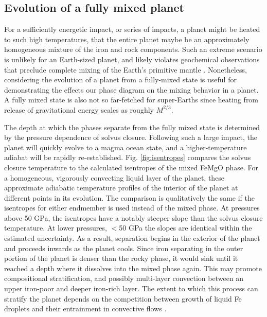 \subsection{Evolution of a fully mixed planet}

For a sufficiently energetic impact, or series of impacts, a planet might be heated to
such high temperatures, that the entire planet maybe be an approximately homogeneous
mixture of the iron and rock components. Such an extreme scenario is unlikely for an
Earth-sized planet, and likely violates geochemical observations that preclude complete
mixing of the Earth's primitive mantle \citep{Mukhopadhyay2012}. Nonetheless, considering the
evolution of a planet from a fully-mixed state is useful for demonstrating the effects
our phase diagram on the mixing behavior in a planet. A fully mixed state is also not so
far-fetched for super-Earths since heating from release of gravitational energy scales as
roughly $M^{2/3}$. %

The depth at which the phases separate from the fully mixed state is determined by the
pressure dependence of solvus closure. Following such a large impact, the planet will
quickly evolve to a magma ocean state, and a higher-temperature adiabat will be rapidly
re-established. Fig. \ref{fig:isentropes} compares the solvus closure temperature to the
calculated isentropes of the mixed FeMgO phase. For a homogeneous, vigorously convecting
liquid layer of the planet, these approximate adiabatic temperature profiles of the
interior of the planet at different points in its evolution.  The comparison is
qualitatively the same if the isentropes for either endmember is used instead of the
mixed phase. At pressures above 50 GPa, the isentropes have a notably steeper slope than
the solvus closure temperature. At lower pressures, $<$50 GPa the slopes are identical within the
estimated uncertainty. As a result, separation begins in the exterior of the planet and
proceeds inwards as the planet cools. Since iron separating in the outer portion of the
planet is denser than the rocky phase, it would sink until it reached a depth where it
dissolves into the mixed phase again. This may promote compositional stratification, and
possibly multi-layer convection between an upper iron-poor and deeper iron-rich layer.
The extent to which this process can stratify the planet depends on the competition
between growth of liquid Fe droplets and their entrainment in convective flows
\citep{Solomatov2007}.

